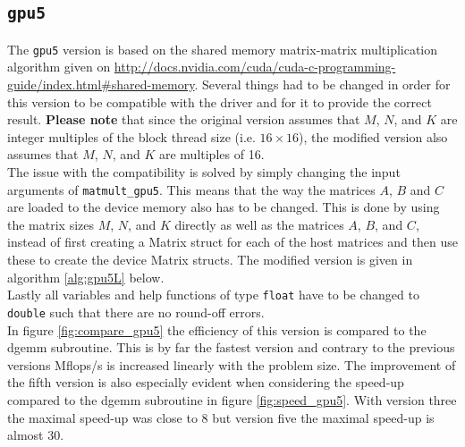 \subsection{\texttt{gpu5}}
The \texttt{gpu5} version is based on the shared memory matrix-matrix multiplication algorithm given on \url{http://docs.nvidia.com/cuda/cuda-c-programming-guide/index.html#shared-memory}. Several things had to be changed in order for this version to be compatible with the driver and for it to provide the correct result. \textbf{Please note} that since the original version assumes that $M$, $N$, and $K$ are integer multiples of the block thread size (i.e. $16\times 16$), the modified version also assumes that $M$, $N$, and $K$ are multiples of 16.\\

\noindent The issue with the compatibility is solved by simply changing the input arguments of \texttt{matmult\_gpu5}. This means that the way the matrices $A$, $B$ and $C$ are loaded to the device memory also has to be changed. This is done by using the matrix sizes $M$, $N$, and $K$ directly as well as the matrices $A$, $B$, and $C$, instead of first creating a Matrix struct for each of the host matrices and then use these to create the device Matrix structs. The modified version is given in algorithm \ref{alg:gpu5L} below.\\

\noindent Lastly all variables and help functions of type \texttt{float} have to be changed to \texttt{double} such that there are no round-off errors.\\



\noindent In figure \ref{fig:compare_gpu5} the efficiency of this version is compared to the dgemm subroutine. This is by far the fastest version and contrary to the previous versions Mflops/s is increased linearly with the problem size. The improvement of the fifth version is also especially evident when considering the speed-up compared to the dgemm subroutine in figure \ref{fig:speed_gpu5}. With version three the maximal speed-up was close to 8 but version five the maximal speed-up is almost 30.

